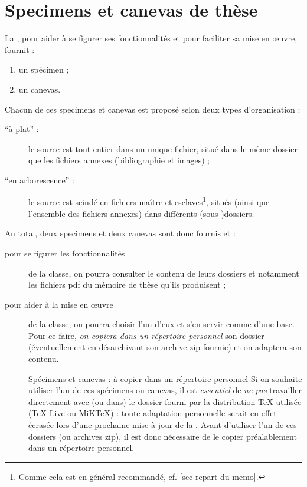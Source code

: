 \chapter{Specimens et canevas de thèse}\label{cha-specimen-canevas}%

La \yatcl, pour aider à se figurer ses fonctionnalités et pour faciliter sa mise
en œuvre, fournit :
\begin{enumerate}
\item un spécimen ;
\item un canevas.
\end{enumerate}
Chacun de ces specimens et canevas est proposé selon deux types d'organisation :
\begin{description}
\item[\enquote{à plat} :] le source  est tout entier dans un unique
  fichier, situé dans le même dossier que les fichiers annexes (bibliographie et
  images) ;
\item[\enquote{en arborescence} :] le source  est scindé en fichiers
  maître et esclaves\footnote{Comme cela est en général recommandé,
    cf. \vref{sec-repart-du-memo}.}, situés (ainsi que l'ensemble des fichiers
  annexes) dans différents (sous-)dossiers.
\end{description}
Au total, deux specimens et deux canevas sont donc fournis et :
\begin{description}
\item[pour se figurer les fonctionnalités] de la classe, on pourra consulter le
  contenu de leurs dossiers et notamment les fichiers \acrshort{pdf} du mémoire
  de thèse qu'ils produisent ;
\item[pour aider à la mise en œuvre] de la classe, on pourra choisir l'un d'eux
  et s'en servir comme d'une base. Pour ce faire, \emph{on copiera dans un
    répertoire personnel} son dossier (éventuellement en désarchivant son
  archive \gls{zip} fournie) et on adaptera son contenu.
  \begin{dbwarning}{Spécimens et canevas : à copier dans un répertoire
      personnel}{}
  Si on souhaite utiliser l'un de ces spécimens ou canevas, il est
  \emph{essentiel} de \emph{ne pas} travailler directement avec (ou dans) le
  dossier fourni par la distribution \TeX{} utilisée (\TeX{} Live ou
  MiK\TeX{}) : toute adaptation personnelle serait en effet écrasée lors d'une
  prochaine mise à jour de la \yatcl{}. Avant d'utiliser l'un de ces dossiers
  (ou archives \gls{zip}), il est donc nécessaire de le copier préalablement
  dans un répertoire personnel.
\end{dbwarning}
\end{description}

